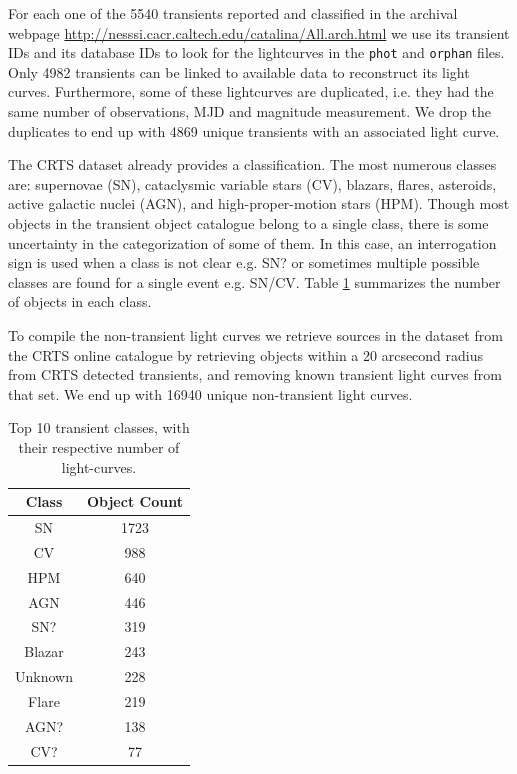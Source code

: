 \documentclass[a4paper,fleqn,usenatbib]{mnras}
\begin{document}
For each one of the 5540 transients reported and classified in the
archival webpage \url{http://nesssi.cacr.caltech.edu/catalina/All.arch.html} we use its
transient IDs and its database IDs to look for the lightcurves in the
\texttt{phot} and \texttt{orphan} files. 
Only 4982 transients can be linked to available data to reconstruct
its light curves. 
Furthermore, some of these lightcurves are duplicated, i.e. they had
the same number of observations, MJD and magnitude measurement. 
We drop the duplicates to end up with 4869 unique transients with an
associated light curve.


The CRTS dataset already provides a classification. 
The most numerous classes are: supernovae (SN),
cataclysmic variable stars (CV), blazars, flares, asteroids, active
galactic nuclei (AGN), and high-proper-motion stars (HPM). 
Though most objects in the transient object catalogue belong to a single class,
there is some uncertainty in the categorization of some of
them. 
In this case, an interrogation sign is used when a class is not clear
e.g. SN? or sometimes multiple possible classes are found for a single
event e.g. SN/CV.
Table \ref{table:top_classes} summarizes the number of objects in
each class. 

To compile the non-transient light curves we retrieve sources in the
dataset from the CRTS online catalogue by retrieving objects within a
20 arcsecond radius from CRTS detected transients, 
and removing known transient light curves from that set. 
We end up with 16940 unique non-transient light curves. 

\begin{table}
\centering
\begin{tabular}{c|c}
    \hline
    Class &  Object Count \\
    \hline
SN & 1723 \\
CV & 988 \\
HPM & 640 \\
AGN & 446 \\
SN? & 319 \\
Blazar & 243 \\
Unknown & 228 \\
Flare & 219 \\
AGN? & 138 \\
CV? & 77 \\
    \hline
\end{tabular}
\caption{Top 10 transient classes, with their respective number of
  light-curves.} 
\label{table:top_classes}
\end{table}
\end{document}
